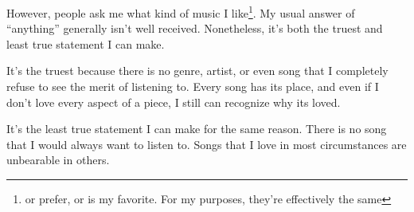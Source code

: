 \documentclass[12pt]{article}[titlepage]
\newcommand{\say}[1]{``#1''}
\newcommand{\1}{\={a}}
\newcommand{\2}{\={e}}
\newcommand{\3}{\={\i}}
\newcommand{\4}{\=o}
\newcommand{\5}{\=u}
\newcommand{\6}{\={A}}
\renewcommand{\,}{\textsuperscript{,}}
\begin{document}
However, people ask me what kind of music I like\footnote{or prefer, or is my favorite. For my purposes, they're effectively the same}.
My usual answer of \say{anything} generally isn't well received.
Nonetheless, it's both the truest and least true statement I can make.

It's the truest because there is no genre, artist, or even song that I completely refuse to see the merit of listening to.
Every song has its place, and even if I don't love every aspect of a piece, I still can recognize why its loved.

It's the least true statement I can make for the same reason.
There is no song that I would always want to listen to.
Songs that I love in most circumstances are unbearable in others.
\end{document}
